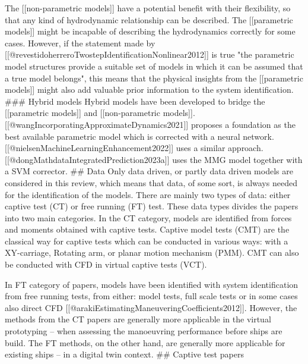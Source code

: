 The [[non-parametric models]] have a potential benefit with their flexibility, so that any kind of hydrodynamic relationship can be described. The [[parametric models]] might be incapable of describing the hydrodynamics correctly for some cases. However, if the statement made by [[@revestidoherreroTwostepIdentificationNonlinear2012]] is true "the parametric model structures provide a suitable set of models in which it can be assumed that a true model belongs", this means that the physical insights from the [[parametric models]] might also add valuable prior information to the system identification.
### Hybrid models
Hybrid models have been developed to bridge the [[parametric models]] and [[non-parametric models]]. [[@wangIncorporatingApproximateDynamics2021]] proposes a foundation as the best available parametric model which is corrected with a neural network. [[@nielsenMachineLearningEnhancement2022]] uses a similar approach. [[@dongMathdataIntegratedPrediction2023a]] uses the MMG model together with a SVM corrector.
## Data
Only data driven, or partly data driven models are considered in this review, which means that data, of some sort, is always needed for the identification of the models. There are mainly two types of data: either captive test (CT) or free running (FT) test. These data types divides the papers into two main categories. In the CT category, models are identified from forces and moments obtained with captive tests. Captive model tests (CMT) are the classical way for captive tests which can be conducted in various ways: with a XY-carriage, Rotating arm, or planar motion mechanism (PMM). CMT can also be conducted with CFD in virtual captive tests (VCT). 

In FT category of papers, models have been identified with system identification from free running tests, from either: model tests, full scale tests or in some cases also direct CFD [[@arakiEstimatingManeuveringCoefficients2012]].  However, the methods from the CT papers are generally more applicable in the virtual prototyping – when assessing the manoeuvring performance before ships are build. The FT methods, on the other hand, are generally more applicable for existing ships – in a digital twin context.   
## Captive test papers

